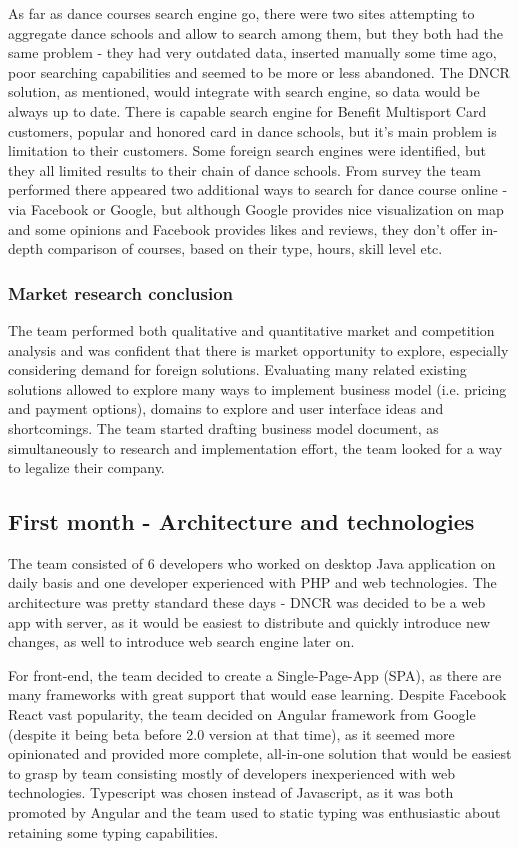 \documentclass{article}
\begin{document}
As far as dance courses search engine go, there were two sites attempting to aggregate dance schools and allow to search among them, but they both had the same problem - they had very outdated data, inserted manually some time ago, poor searching capabilities and seemed to be more or less abandoned. The DNCR solution, as mentioned, would integrate with search engine, so data would be always up to date. There is capable search engine for Benefit Multisport Card customers, popular and honored card in dance schools, but it's main problem is limitation to their customers. Some foreign search engines were identified, but they all limited results to their chain of dance schools. From survey the team performed there appeared two additional ways to search for dance course online - via Facebook or Google, but although Google provides nice visualization on map and some opinions and Facebook provides likes and reviews, they don't offer in-depth comparison of courses, based on their type, hours, skill level etc.

\subsubsection{Market research conclusion}
The team performed both qualitative and quantitative market and competition analysis and was confident that there is market opportunity to explore, especially considering demand for foreign solutions. Evaluating many related existing solutions allowed to explore many ways to implement business model (i.e. pricing and payment options), domains to explore and user interface ideas and shortcomings. The team started drafting business model document, as simultaneously to research and implementation effort, the team looked for a way to legalize their company.

\subsection{First month - Architecture and technologies}
The team consisted of 6 developers who worked on desktop Java application on daily basis and one developer experienced with PHP and web technologies. The architecture was pretty standard these days - DNCR was decided to be a web app with server, as it would be easiest to distribute and quickly introduce new changes, as well to introduce web search engine later on.

For front-end, the team decided to create a Single-Page-App (SPA), as there are many frameworks with great support that would ease learning. Despite Facebook React vast popularity, the team decided on Angular framework from Google (despite it being beta before 2.0 version at that time), as it seemed more opinionated and provided more complete, all-in-one solution that would be easiest to grasp by team consisting mostly of developers inexperienced with web technologies. Typescript was chosen instead of Javascript, as it was both promoted by Angular and the team used to static typing was enthusiastic about retaining some typing capabilities.
\end{document}

